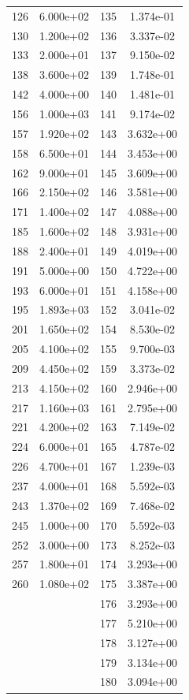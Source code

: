 \documentclass[12pt]{article}
\begin{document}
\begin{longtable}{@{}cccc@{}}
126 & 6.000e+02 & 135 & 1.374e-01 \\
130 & 1.200e+02 & 136 & 3.337e-02 \\
133 & 2.000e+01 & 137 & 9.150e-02 \\
138 & 3.600e+02 & 139 & 1.748e-01 \\
142 & 4.000e+00 & 140 & 1.481e-01 \\
156 & 1.000e+03 & 141 & 9.174e-02 \\
157 & 1.920e+02 & 143 & 3.632e+00 \\
158 & 6.500e+01 & 144 & 3.453e+00 \\
162 & 9.000e+01 & 145 & 3.609e+00 \\
166 & 2.150e+02 & 146 & 3.581e+00 \\
171 & 1.400e+02 & 147 & 4.088e+00 \\
185 & 1.600e+02 & 148 & 3.931e+00 \\
188 & 2.400e+01 & 149 & 4.019e+00 \\
191 & 5.000e+00 & 150 & 4.722e+00 \\
193 & 6.000e+01 & 151 & 4.158e+00 \\
195 & 1.893e+03 & 152 & 3.041e-02 \\
201 & 1.650e+02 & 154 & 8.530e-02 \\
205 & 4.100e+02 & 155 & 9.700e-03 \\
209 & 4.450e+02 & 159 & 3.373e-02 \\
213 & 4.150e+02 & 160 & 2.946e+00 \\
217 & 1.160e+03 & 161 & 2.795e+00 \\
221 & 4.200e+02 & 163 & 7.149e-02 \\
224 & 6.000e+01 & 165 & 4.787e-02 \\
226 & 4.700e+01 & 167 & 1.239e-03 \\
237 & 4.000e+01 & 168 & 5.592e-03 \\
243 & 1.370e+02 & 169 & 7.468e-02 \\
245 & 1.000e+00 & 170 & 5.592e-03 \\
252 & 3.000e+00 & 173 & 8.252e-03 \\
257 & 1.800e+01 & 174 & 3.293e+00 \\
260 & 1.080e+02 & 175 & 3.387e+00 \\
 &  & 176 & 3.293e+00 \\
 &  & 177 & 5.210e+00 \\
 &  & 178 & 3.127e+00 \\
 &  & 179 & 3.134e+00 \\
 &  & 180 & 3.094e+00 \\

\end{longtable}
\end{document}
